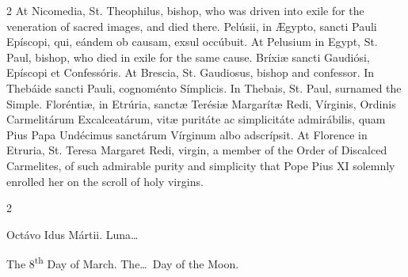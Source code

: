 \begin{paracol}{2}
\switchcolumn
{}
At Nicomedia, St. Theophilus, bishop, who was driven into exile for the 
 veneration of sacred images, and died there.
\switchcolumn*
{}
Pelúsii, in Ægypto, sancti Pauli Epíscopi, qui, 
 eándem ob causam, exsul occúbuit.
\switchcolumn
{}
At Pelusium in Egypt, St. Paul, bishop, who died in exile for the same 
 cause.
\switchcolumn*
{}
Bríxiæ sancti Gaudiósi, Epíscopi et Confessóris.
\switchcolumn
{}
At Brescia, St. Gaudiosus, bishop and confessor.
\switchcolumn*
{}
In Thebáide sancti Pauli, cognoménto Símplicis.
\switchcolumn
{}
In Thebais, St. Paul, surnamed the Simple.
\switchcolumn*
{}
Floréntiæ, in Etrúria, sanctæ Terésiæ Margarítæ 
 Redi, Vírginis, Ordinis Carmelitárum Excalceatárum, vitæ puritáte ac 
 simplicitáte admirábilis, quam Pius Papa Undécimus sanctárum Vírginum albo 
 adscrípsit.
\switchcolumn
{}
At Florence in Etruria, St. Teresa Margaret Redi, virgin, a member of the 
 Order of Discalced Carmelites, of such admirable purity and simplicity that 
 Pope Pius XI solemnly enrolled her on the scroll of holy virgins.
\switchcolumn*
{}
\end{paracol}


\begin{paracol}{2}
\begin{center}{\color{gregoriocolor} Octávo Idus Mártii. 
 Luna\dots\ }\end{center}
\switchcolumn
{}
\begin{center}{\color{gregoriocolor} The 8\textsuperscript{th} Day of March. 
 The\dots\ Day of the Moon.}\end{center}
\end{paracol}

